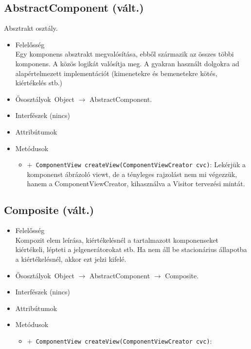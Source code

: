 \subsection{AbstractComponent (vált.)}
Absztrakt osztály.
\begin{itemize}
\item Felelősség\\
Egy komponens absztrakt megvalósítása, ebből származik az összes többi  komponens. A közös logikát valósítja meg. A gyakran használt dolgokra  ad alapértelmezett implementációt (kimenetekre és bemenetekre kötés, kiértékelés stb.)
\item Ősosztályok\ Object $\rightarrow{}$ AbstractComponent.
\item Interfészek (nincs)
\item Attribútumok $\ $
\item Metódusok$\ $
\begin{itemize}
	\item[] \texttt{$+$ ComponentView createView(ComponentViewCreator cvc)}: Lekérjük a komponenst ábrázoló viewt, de a tényleges rajzolást nem mi végezzük, hanem  a ComponentViewCreator, kihasználva a Visitor tervezési mintát.
\end{itemize}
\end{itemize}

\subsection{Composite (vált.)}
\begin{itemize}
\item Felelősség\\
Kompozit elem leírása, kiértékelésnél a tartalmazott komponenseket kiértékeli, lépteti  a jelgenerátorokat stb. Ha nem áll be stacionárius állapotba a kiértékelésnél, akkor ezt jelzi kifelé.
\item Ősosztályok\ Object $\rightarrow{}$ AbstractComponent $\rightarrow{}$ Composite.
\item Interfészek (nincs)
\item Attribútumok $\ $
\item Metódusok$\ $
\begin{itemize}
	\item[] \texttt{$+$ ComponentView createView(ComponentViewCreator cvc)}: 
\end{itemize}
\end{itemize}

